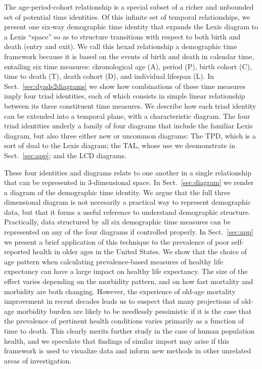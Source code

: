 \documentclass[12pt,oneside,a4paper]{article} %
\theoremstyle{definition}
\begin{document}
The age-period-cohort relationship is a special subset of a richer and unbounded
set of potential time identities. Of this infinite set of
temporal relationships, we present one six-way demographic time
identity that expands the Lexis diagram to a Lexis ``space'' so as to structure
transitions with respect to both birth and death (entry and exit). We call this
hexad relationship a demographic time framework because it is based on
the events of birth and death in calendar time, entailing six time measures:
chronological age (A), period (P), birth cohort (C), time to death (T), death cohort (D), and individual lifespan (L). In
Sect.~\ref{sec:dyads2diagrams} we show how combinations of these time measures imply four triad identities, each of which consists in simple linear relationship between its three
constituent time measures. We describe how each triad identity can be
extended into a temporal plane, with a characteristic diagram. The four triad
identities underly a family of four diagrams that include the
familiar Lexis diagram, but also three either new or
uncommon diagrams: The TPD, which is a sort of dual to the Lexis diagram; the TAL, whose use we deomonstrate in Sect.~\ref{sec:app}; and the LCD diagrams.

These four identities and diagrams relate to one another in a single
relationship that can be represented in 3-dimensional space. 
In Sect.~\ref{sec:diagram} we render a diagram of the demographic time
identity. We argue that the full three dimensional diagram is not necesarily a
practical way to represent demographic data, but that it forms a useful
reference to understand demographic structure. Practically, data structured by
all six demographic time measures can be represented on any of the four diagrams
if controlled properly. In Sect.~\ref{sec:app} we present a brief
application of this technique to the prevalence of poor self-reported health in
older ages in the United States.  We show that the choice of age pattern when calculating
prevalence-based measures of healthy life expectancy can have a large impact on
healthy life expectancy. The size of the effect varies depending on the morbidity pattern, and on how fast mortality and
morbidity are both changing. However, the experience of old-age mortality
improvement in recent decades leads us to suspect that many projections of
old-age morbidity burden are likely to be needlessly pessimistic if it is the
case that the prevalence of pertinent health conditions varies primarily as a
function of time to death. This clearly merits further study in the case of human population
health, and we speculate that findings of similar import may arise if
this framework is used to visualize data and inform new methods in other
unrelated areas of investigation.
\end{document}
